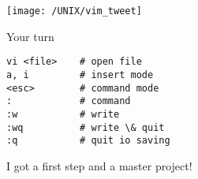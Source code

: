 \documentclass[xcolor=dvipsnames]{beamer}
\begin{document}
\begin{frame}
	\begin{center}
		\texttt{[image: /UNIX/vim\_tweet]}
	\end{center}
\end{frame}

\begin{frame}[fragile]
\begin{center}
	\Huge
	Your turn
\end{center}
\Large
\begin{verbatim}
vi <file>    # open file
a, i         # insert mode
<esc>        # command mode
:            # command
:w           # write
:wq          # write \& quit
:q           # quit io saving
\end{verbatim}
\end{frame}

\begin{frame}
	\begin{center}
		\Huge
		I got a first step and a master project!\\
	\end{center}
\end{frame}
\end{document}
